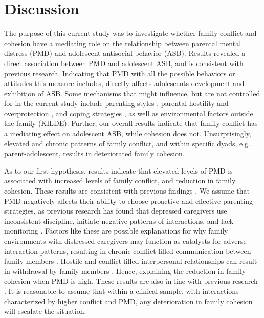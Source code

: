 \section{Discussion}

The purpose of this current study was to investigate whether family conflict and cohesion have a mediating role on the relationship between parental mental distress (PMD) and adolescent antisocial behavior (ASB). Results revealed a direct association between PMD and adolescent ASB, and is consistent with previous research. Indicating that PMD with all the possible behaviors or attitudes this measure includes, directly affects adolescents development and exhibition of ASB. Some mechanisms that might influence, but are not controlled for in the current study include parenting styles \parencite{hautmann:2015, vera:2012}, parental hostility and overprotection \parencite{sellers:2014}, and coping strategies \parencite{francisco:2015}, as well as environmental factors outside the family (KILDE). Further, our overall results indicate that family conflict has a mediating effect on adolescent ASB, while cohesion does not. Unsurprisingly, elevated and chronic patterns of family conflict, and within specific dyads, e.g. parent-adolescent, results in deteriorated family cohesion.

As to our first hypothesis, results indicate that elevated levels of PMD is associated with increased levels of family conflict, and reduction in family cohesion. These results are consistent with previous findings \parencite[e.g.,][]{garber:2005, perez:2018, xu:2017}. We assume that PMD negatively affects their ability to choose proactive and effective parenting strategies, as previous research has found that depressed caregivers use inconsistent discipline, initiate negative patterns of interactions, and lack monitoring \parencite{korhonen:2014,perez:2018}. Factors like these are possible explanations for why family environments with distressed caregivers may function as catalysts for adverse interaction patterns, resulting in chronic conflict-filled communication between family members \parencite{garber:2005}.  Hostile and conflict-filled interpersonal relationships can result in withdrawal by family members \parencite{romm:2022}. Hence, explaining the reduction in family cohesion when PMD is high. These results are also in line with previous research \parencite{li:2021, vanloon:2014}. It is reasonable to assume that within a clinical sample, with interactions characterized by higher conflict and PMD, any deterioration in family cohesion will escalate the situation.

